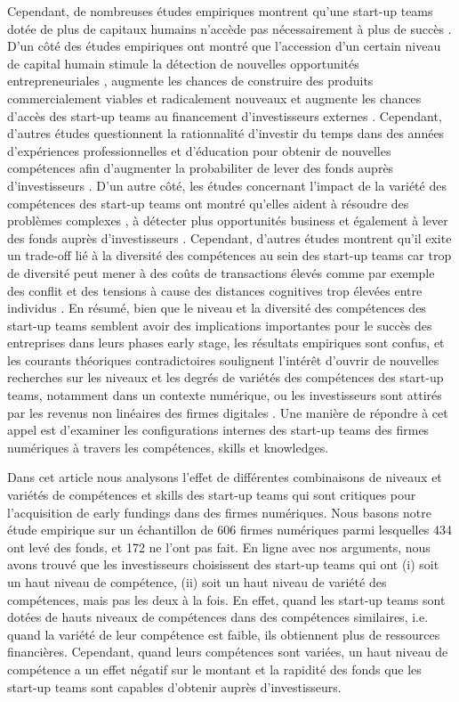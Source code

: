 \documentclass[12pt]{article}
\begin{document}
Cependant, de nombreuses études empiriques montrent qu'une start-up teams dotée de plus de capitaux humains n'accède pas nécessairement à plus de succès \citep{pierce2013too}. D'un côté des études empiriques ont montré que l'accession d'un certain niveau de capital humain stimule la détection de nouvelles opportunités entrepreneuriales \citep{shane2000promise}, augmente les chances de construire des produits commercialement viables et radicalement nouveaux \citep{marvel2007technology} et augmente les chances d'accès des start-up teams au financement d'investisseurs externes \citep{beckman2007early}. Cependant, d'autres études questionnent la rationnalité d'investir du temps dans des années d'expériences professionnelles et d'éducation pour obtenir de nouvelles compétences afin d'augmenter la probabiliter de lever des fonds auprès d'investisseurs \citep{audretsch2004financing}. D'un autre côté, les études concernant l'impact de la variété des compétences des start-up teams  ont montré qu'elles aident à résoudre des problèmes complexes \citep{hong2001problem}, à détecter plus opportunités business \citep{shane2000prior} et également à lever des fonds auprès d'investisseurs \citep{ko2018signaling}. Cependant, d'autres études montrent qu'il exite un trade-off lié à la diversité des compétences au sein des start-up teams car trop de diversité peut mener à des coûts de transactions élevés comme par exemple des conflit et des tensions à cause des distances cognitives trop élevées entre individus \citep{nooteboom2007optimal}. En résumé, bien que le niveau et la diversité des compétences des start-up teams semblent avoir des implications importantes pour le succès des entreprises dans leurs phases early stage, les résultats empiriques sont confus, et les courants théoriques contradictoires soulignent l'intérêt d'ouvrir de nouvelles recherches sur les niveaux et les degrés de variétés des compétences des start-up teams, notamment dans un contexte numérique, ou les investisseurs sont attirés par les revenus non linéaires des firmes digitales \citep{nambisan2017digital}. Une manière de répondre à cet appel est d'examiner les configurations internes des start-up teams des firmes numériques à travers les compétences, skills et knowledges.

Dans cet article nous analysons l'effet de différentes combinaisons de niveaux et variétés de compétences et skills des start-up teams qui sont critiques pour l'acquisition de early fundings dans des firmes numériques. Nous basons notre étude empirique sur un échantillon de 606 firmes numériques parmi lesquelles 434 ont levé des fonds, et 172 ne l'ont pas fait. En ligne avec nos arguments, nous avons trouvé que les investisseurs choisissent des start-up teams qui ont (i) soit un haut niveau de compétence, (ii) soit un haut niveau de variété des compétences, mais pas les deux à la fois. En effet, quand les start-up teams sont dotées de hauts niveaux de compétences dans des compétences similaires, i.e. quand la variété de leur compétence est faible, ils obtiennent plus de ressources financières. Cependant, quand leurs compétences sont variées, un haut niveau de compétence a un effet négatif sur le montant et la rapidité des fonds que les start-up teams sont capables d'obtenir auprès d'investisseurs.
\end{document}
